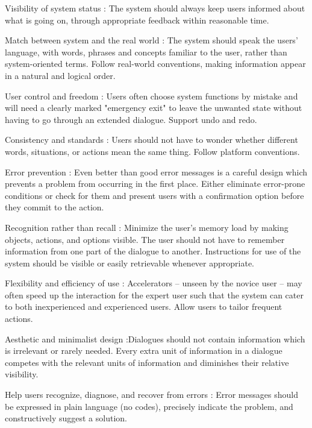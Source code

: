 \documentclass{article}
\begin{document}
\item Visibility of system status : The system should always keep users informed about what is going on, through appropriate feedback within reasonable time. 

\item Match between system and the real world : The system should speak the users' language, with words, phrases and concepts familiar to the user, rather than system-oriented terms. Follow real-world conventions, making information appear in a natural and logical order.
 
\item User control and freedom : Users often choose system functions by mistake and will need a clearly marked "emergency exit" to leave the unwanted state without having to go through an extended dialogue. Support undo and redo. 

\item Consistency and standards : Users should not have to wonder whether different words, situations, or actions mean the same thing. Follow platform conventions. 

\item Error prevention : Even better than good error messages is a careful design which prevents a problem from occurring in the first place. Either eliminate error-prone conditions or check for them and present users with a confirmation option before they commit to the action. 

\item Recognition rather than recall : Minimize the user's memory load by making objects, actions, and options visible. The user should not have to remember information from one part of the dialogue to another. Instructions for use of the system should be visible or easily retrievable whenever appropriate. 

\item Flexibility and efficiency of use : Accelerators -- unseen by the novice user -- may often speed up the interaction for the expert user such that the system can cater to both inexperienced and experienced users. Allow users to tailor frequent actions. 
    
\item Aesthetic and minimalist design :Dialogues should not contain information which is irrelevant or rarely needed. Every extra unit of information in a dialogue competes with the relevant units of information and diminishes their relative visibility. 
    
\item Help users recognize, diagnose, and recover from errors : Error messages should be expressed in plain language (no codes), precisely indicate the problem, and constructively suggest a solution. 
    
\end{document}
